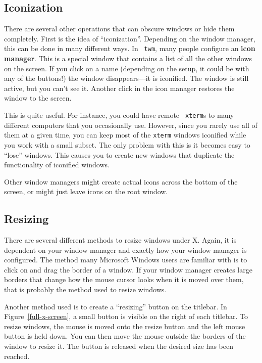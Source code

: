 \subsection{Iconization}

There are several other operations that can obscure windows or hide
them completely. First is the idea of ``iconization''. Depending on
the window manager, this can be done in many different ways. In {\tt
  twm}, many people configure an {\bf icon manager}. This is a special window that contains a list of all the
other windows on the screen.  If you click on a name (depending on the
setup, it could be with any of the buttons!) the window
disappears---it is iconified.  The window is still active, but you
can't see it.  Another click in the icon manager restores the window
to the screen.

This is quite useful.  For instance, you could have remote {\tt
  xterm}s to many different computers that you occasionally use.
However, since you rarely use all of them at a given time, you can
keep most of the {\tt xterm} windows iconified while you work with a
small subset. The only problem with this is it becomes easy to
``lose'' windows. This causes you to create new windows that duplicate
the functionality of iconified windows.

Other window managers might create actual icons across the bottom of
the screen, or might just leave icons on the root
window.

\subsection{Resizing}

There are several different methods to resize windows under X.  Again,
it is dependent on your window manager and exactly how your window
manager is configured.  The method many Microsoft Windows users are
familiar with is to click on and drag the border of a window.  If your
window manager creates large borders that change how the mouse cursor
looks when it is moved over them, that is probably the method used to
resize windows.

Another method used is to create a ``resizing'' button on the
titlebar.  In Figure~\ref{full-x-screen}, a small button is visible on
the right of each titlebar.  To resize windows, the mouse is moved
onto the resize button and the left mouse button is held down.  You
can then move the mouse outside the borders of the window to resize
it.  The button is released when the desired size has been reached.

